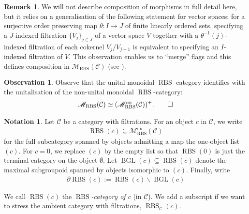 \documentclass[12pt, reqno]{amsart}
\theoremstyle{plain}
\theoremstyle{definition}
\newtheorem{remark}[theorem]{Remark}
\newtheorem{observation}[theorem]{Observation}
\newtheorem{notation}[theorem]{Notation}
\begin{document}
\begin{remark}
We will not describe composition of morphisms in full detail here, but it relies on a generalisation of the following statement for
vector spaces: for a surjective order preserving map $\theta\colon  I \rightarrow J$ of finite linearly ordered sets,
specifying a $J$-indexed filtration $\{V_j\}_{j\in J}$ of a vector space $V$ together with a $\theta^{-1}(j)$-indexed filtration of each cokernel $V_j/V_{j-1}$ is equivalent to specifying an $I$-indexed filtration of $V$. This observation enables us to ``merge'' flags and this defines composition in $\mathscr{M}_{\operatorname{RBS}}(\mathcal{C})$ (see \cite[Construction 7.14 and Definition 7.7]{ClausenOrsnesJansen}).
\end{remark}

\begin{observation}
Observe that the unital monoidal $\operatorname{RBS}$-category identifies with the unitalisation of the non-unital monoidal $\operatorname{RBS}$-category:
\begin{equation*}
\mathscr{M}_{\operatorname{RBS}}(\mathcal{C})\simeq (\mathscr{M}_{\operatorname{RBS}}^{\operatorname{nu}}(\mathcal{C}))^+.\qedhere
\end{equation*}
\end{observation}

\begin{notation}\label{general RBS-categories}
Let $\mathcal{C}$ be a category with filtrations. For an object $c$ in $\mathcal{C}$, we write
\begin{align*}
\operatorname{RBS}(c)\subseteq \mathscr{M}_{\operatorname{RBS}}^{\operatorname{nu}}(\mathcal{C})
\end{align*}
for the full subcategory spanned by objects admitting a map the one-object list $(c)$. For $c=0$, we replace $(c)$ by the empty list so that $\operatorname{RBS}(0)$ is just the terminal category on the object $\emptyset$. Let $\operatorname{BGL}(c)\subseteq \operatorname{RBS}(c)$ denote the maximal subgroupoid spanned by objects isomorphic to $(c)$.
Finally, write
\begin{align*}
\partial\operatorname{RBS}(c):=\operatorname{RBS}(c)\smallsetminus \operatorname{BGL}(c)
\end{align*}

We call $\operatorname{RBS}(c)$ the \textit{$\operatorname{RBS}$-category of $c$} (in $\mathcal{C}$). We add a subscript if we want to stress the ambient category with filtrations, $\operatorname{RBS}_\mathcal{C}(c)$.
\end{notation}
\end{document}
